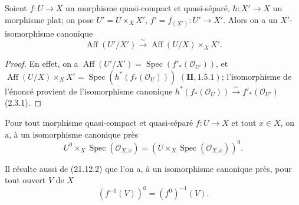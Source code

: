 \begin{proposition}[21.12.2]
\label{IV.21.12.2}
Soient $f:U\to X$ un morphisme quasi-compact et quasi-séparé,
$h:X'\to X$ un morphisme \textup{plat}; on pose $U'=U\times_X X'$,
$f'=f_{(X')}:U'\to X'$. Alors on a un $X'$-isomorphisme canonique
\[
\label{IV.21.12.2.1}
  \operatorname{Aff}(U'/X')\xrightarrow{\sim}
  \operatorname{Aff}(U/X)\times_X X'.
  \tag{21.12.2.1}
\]
\end{proposition}

\begin{proof}
En effet, on a
$\operatorname{Aff}(U'/X')=\operatorname{Spec}(f'_*(\mathcal O_{U'}))$, et
$\operatorname{Aff}(U/X)\times_X X'=\operatorname{Spec}(h^*(f_*(\mathcal O_U)))$
$(\mathbf{II}, 1.5.1)$; l'isomorphisme de l'énoncé provient de l'isomorphisme canonique
$h^*(f_*(\mathcal O_U))\xrightarrow{\sim}f'_*(\mathcal O_{U'})$ (2.3.1).
\end{proof}

\begin{corollary}[21.12.3]
\label{IV.21.12.3}
Pour tout morphisme quasi-compact et quasi-séparé $f:U\to X$ et tout $x\in X$, on a,
à un isomorphisme canonique près
\[
  U^0\times_X\operatorname{Spec}(\mathcal O_{X,x})
  =(U\times_X\operatorname{Spec}(\mathcal O_{X,x}))^0.
\]
\end{corollary}

Il résulte aussi de (21.12.2) que l'on a, à un isomorphisme canonique près, pour tout
ouvert $V$ de $X$
\[
\label{IV.21.12.4}
  (f^{-1}(V))^0=(f^0)^{-1}(V).
  \tag{21.12.4}
\]


